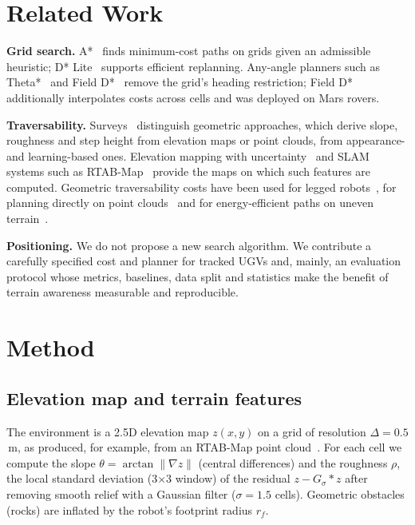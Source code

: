 \documentclass[conference]{IEEEtran}
\begin{document}
\section{Related Work}
\textbf{Grid search.} A*~\cite{hart1968astar} finds minimum-cost paths on
grids given an admissible heuristic; D* Lite~\cite{koenig2002dstarlite}
supports efficient replanning. Any-angle planners such as
Theta*~\cite{nash2007theta,nash2010lazy} and Field D*~\cite{ferguson2006fielddstar}
remove the grid's heading restriction; Field D* additionally interpolates
costs across cells and was deployed on Mars rovers.

\textbf{Traversability.} Surveys~\cite{papadakis2013survey,guastella2021review}
distinguish geometric approaches, which derive slope, roughness and step
height from elevation maps or point clouds, from appearance- and
learning-based ones. Elevation mapping with uncertainty~\cite{fankhauser2018elevation}
and SLAM systems such as RTAB-Map~\cite{labbe2019rtabmap} provide the maps on
which such features are computed. Geometric traversability costs have been
used for legged robots~\cite{wermelinger2016legged}, for planning directly on
point clouds~\cite{krusi2017pointclouds} and for energy-efficient paths on
uneven terrain~\cite{ganganath2015energy}.

\textbf{Positioning.} We do not propose a new search algorithm. We contribute
a carefully specified cost and planner for tracked UGVs and, mainly, an
evaluation protocol whose metrics, baselines, data split and statistics make
the benefit of terrain awareness measurable and reproducible.

\section{Method}\label{sec:method}
\subsection{Elevation map and terrain features}
The environment is a 2.5D elevation map $z(x,y)$ on a grid of resolution
$\Delta=0.5$\,m, as produced, for example, from an RTAB-Map point
cloud~\cite{labbe2019rtabmap}. For each cell we compute the slope
$\theta=\arctan\|\nabla z\|$ (central differences) and the roughness $\rho$,
the local standard deviation (3$\times$3 window) of the residual
$z - G_\sigma * z$ after removing smooth relief with a Gaussian filter
($\sigma=1.5$ cells). Geometric obstacles (rocks) are inflated by the robot's
footprint radius $r_f$.
\end{document}
